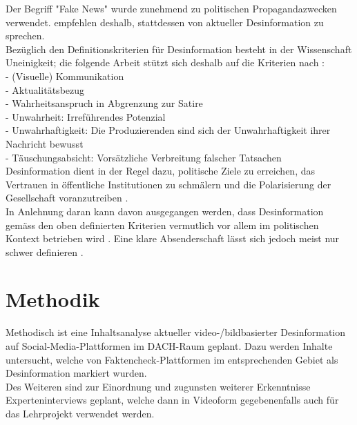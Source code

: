 \documentclass[12pt,a4paper]{article}        %
\begin{document}
Der Begriff "Fake News" wurde zunehmend zu politischen Propagandazwecken verwendet. \Textcite[148]{marx_fake_2020} empfehlen deshalb, stattdessen von aktueller Desinformation zu sprechen. \\
Bezüglich den Definitionskriterien für Desinformation besteht in der Wissenschaft Uneinigkeit; die folgende Arbeit stützt sich deshalb auf die Kriterien nach \textcite{marx_fake_2020}: \\
- (Visuelle) Kommunikation \\
- Aktualitätsbezug \\
- Wahrheitsanspruch in Abgrenzung zur Satire \\
- Unwahrheit: Irreführendes Potenzial \\
- Unwahrhaftigkeit: Die Produzierenden sind sich der Unwahrhaftigkeit ihrer Nachricht bewusst \\
- Täuschungsabsicht: Vorsätzliche Verbreitung falscher Tatsachen\\

Desinformation dient in der Regel dazu, politische Ziele zu erreichen, das Vertrauen in öffentliche Institutionen zu schmälern und die Polarisierung der Gesellschaft voranzutreiben \parencites[vgl.][ ]{allcott_social_2017}[225]{schmidt_meinungsbildung_2022}[162]{lange_unsicherheit_2019}. \\

In Anlehnung daran kann davon ausgegangen werden, dass Desinformation gemäss den oben definierten Kriterien vermutlich vor allem im politischen Kontext betrieben wird \parencites[vgl.][51]{sammer_fake_2021}[217]{allcott_social_2017}[498]{behnke_manipulation_2018}. Eine klare Absenderschaft lässt sich jedoch meist nur schwer definieren \parencite[498-499]{behnke_manipulation_2018}.

\section{Methodik}
Methodisch ist eine Inhaltsanalyse aktueller video-/bildbasierter Desinformation auf Social-Media-Plattformen im DACH-Raum geplant. Dazu werden Inhalte untersucht, welche von Faktencheck-Plattformen im entsprechenden Gebiet als Desinformation markiert wurden. \\
Des Weiteren sind zur Einordnung und zugunsten weiterer Erkenntnisse Experteninterviews geplant, welche dann in Videoform gegebenenfalls auch für das Lehrprojekt verwendet werden.
\end{document}
